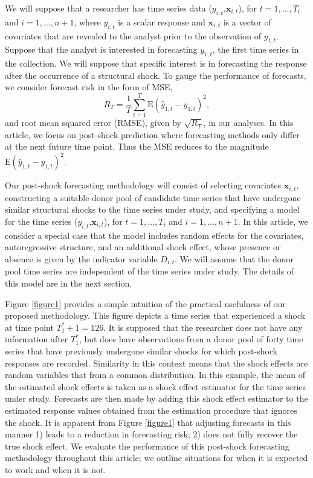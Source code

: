\documentclass[11pt,3p,review,authoryear]{elsarticle}
\newcommand{\x}{\textbf{x}}
\def\E#1{\mathrm{E}(#1)} %
\theoremstyle{definition}
\begin{document}
We will suppose that a researcher has time series data ($y_{i,t}$,$\x_{i,t}$), for $t = 1, \ldots,  T_i$ and $i = 1, \ldots, n+1$, where $y_{i,t}$ is a scalar response and $\x_{i,t}$ is a vector of covariates that are revealed to the analyst prior to the observation of $y_{1,t}$.  Suppose that the analyst is interested in forecasting $y_{1,t}$, the first time series in the collection. We will suppose that specific interest is in forecasting the response after the occurrence of a structural shock. To gauge the performance of forecasts, we consider forecast risk in the form of MSE,
$$
  R_T = \frac{1}{T}\sum_{t=1}^T\E{\hat y_{1,t} - y_{1,t}}^2,
$$
and root mean squared error (RMSE), given by $\sqrt{R_T}$, in our analyses. In this article, we focus on post-shock prediction where forecasting methods only differ at the next future time point. Thus the MSE reduces to the magnitude $\E{\hat y_{1,t} - y_{1,t}}^2$.


Our post-shock forecasting methodology will consist of selecting covariates $\x_{i,t}$, constructing a suitable donor pool of candidate time series that have undergone similar structural shocks to the time series under study, and specifying a model for the time series ($y_{i,t}$,$\x_{i,t}$), for $t = 1, \ldots,  T_i$ and $i = 1, \ldots, n+1$. In this article, we consider a  special case that the model includes random effects for the covariates, autoregressive structure, and an additional shock effect, whose presence or absence is given by the indicator variable $D_{i,t}$.  We will assume that the donor pool time series are independent of the time series under study. The details of this model are in the next section.



Figure \ref{figure1} provides a simple intuition of the practical usefulness of our proposed methodology. This figure depicts a time series that experienced a shock at time point $T_1^*+1 = 126$. It is supposed that the researcher does not have any information after $T_1^*$, but does have observations from a donor pool of forty time series that have previously undergone similar shocks for which post-shock responses are recorded. Similarity in this context means that the shock effects are random variables that from a common distribution. In this example, the mean of the estimated shock effects is taken as a shock effect estimator for the time series under study. Forecasts are then made by adding this shock effect estimator to the estimated response values obtained from the estimation procedure that ignores the shock. It is apparent from Figure \ref{figure1} that adjusting forecasts in this manner 1) leads to a reduction in forecasting risk; 2) does not fully recover the true shock effect. We evaluate the performance of this post-shock forecasting methodology throughout this article; we outline situations for when it is expected to work and when it is not.
\end{document}
